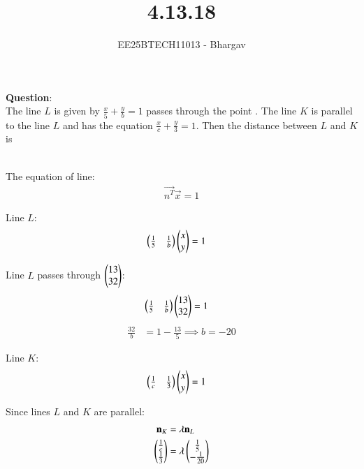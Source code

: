 \documentclass[journal]{IEEEtran}
\begin{document}

\vspace{3cm}

\title{4.13.18}
\author{EE25BTECH11013 - Bhargav}
\maketitle
{\let\newpage\relax\maketitle}

\renewcommand{\thefigure}{\theenumi}
\renewcommand{\thetable}{\theenumi}
\setlength{\intextsep}{10pt} 

\renewcommand{\thetable}{\theenumi}
\textbf{Question}:\\
The line $L$ is given by $\frac{x}{5} + \frac{y}{b} = 1$ passes through the point . The line $K$ is parallel to the line $L$ and has the equation $\frac{x}{c} + \frac{y}{3} = 1$. Then the distance between $L$ and $K$ is



\solution \\

The equation of line:
\begin{align}
\vec{n^T}\vec{x} = 1
\end{align}

Line $L$:
\begin{align}
    \begin{pmatrix}\frac{1}{5} & \frac{1}{b}\end{pmatrix} \begin{pmatrix}x \\ y\end{pmatrix} &= 1
\end{align}

Line $L$ passes through $\begin{pmatrix}13 \\ 32\end{pmatrix}$:
\begin{align}
\begin{pmatrix}\frac{1}{5} & \frac{1}{b}\end{pmatrix} \begin{pmatrix}13 \\ 32\end{pmatrix} &= 1 
\end{align}
\begin{align}
\frac{32}{b} &= 1 - \frac{13}{5}  \implies b=-20
\end{align}



Line $K$:
\begin{align}
    \begin{pmatrix}\frac{1}{c} & \frac{1}{3}\end{pmatrix} \begin{pmatrix}x \\ y\end{pmatrix} &= 1
\end{align}

Since lines $L$ and $K$ are parallel:
\begin{align}
    \mathbf{n}_K &= \lambda \mathbf{n}_L \\
    \begin{pmatrix}\frac{1}{c} \\ \frac{1}{3}\end{pmatrix} &= \lambda \begin{pmatrix}\frac{1}{5} \\ -\frac{1}{20}\end{pmatrix}
\end{align}
\end{document}
